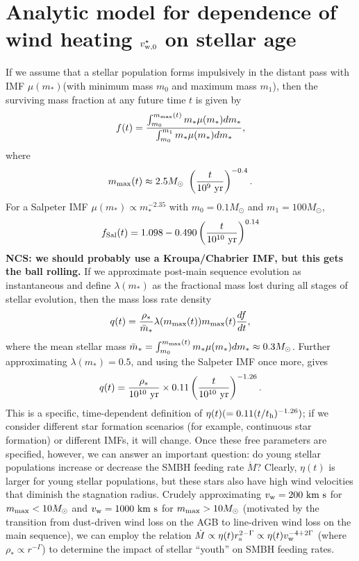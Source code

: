\documentclass[usenatbib,fleqn]{mn2e}
\begin{document}
\section{Analytic model for dependence of wind heating $v_{\rm w,0}^{\star}$ on stellar age}
\label{app:windheat}
If we assume that a stellar population forms impulsively in the distant pass with IMF $\mu(m_*)$(with minimum mass $m_0$ and maximum mass $m_1$), then the surviving mass fraction at any future time $t$ is given by 
\begin{equation}
f(t) =\frac{ \int_{m_0}^{m_{\rm max}(t)} m_* \mu(m_*) dm_* }{ \int_{m_0}^{m_1} m_* \mu(m_*) dm_* },
\end{equation}
where 
\begin{equation}
m_{\rm max}(t) \approx 2.5M_\odot~ \left( \frac{t}{10^9~{\rm yr}} \right)^{-0.4}.
\end{equation}
For a Salpeter IMF $\mu(m_*) \propto m_*^{-2.35}$ with $m_0=0.1M_\odot$ and $m_1=100M_\odot$,
\begin{equation}
f_{\rm Sal}(t) = 1.098 - 0.490 \left(\frac{t}{10^{10}~{\rm yr}} \right)^{0.14}
\end{equation}
{\bf NCS: we should probably use a Kroupa/Chabrier IMF, but this gets the ball rolling.}
If we approximate post-main sequence evolution as instantaneous and define $\lambda(m_*)$ as the fractional mass lost during all stages of stellar evolution, then the mass loss rate density
\begin{equation}
q(t) = \frac{\rho_*}{\bar{m}_*} \lambda(m_{\rm max}(t)) m_{\rm max}(t) \frac{df}{dt},
\end{equation}
where the mean stellar mass $\bar{m}_* = \int_{m_0}^{m_{\rm max}(t)} m_*\mu(m_*)dm_* \approx 0.3 M_\odot$.  Further approximating $\lambda(m_*)=0.5$, and using the Salpeter IMF once more, gives
\begin{equation}
q(t) = \frac{\rho_*}{10^{10}~{\rm yr}} \times 0.11 \left(\frac{t}{10^{10}~{\rm yr}} \right)^{-1.26}.
\end{equation}
This is a specific, time-dependent definition of $\eta(t) (=0.11(t/t_{\rm h})^{-1.26})$; if we consider different star formation scenarios (for example, continuous star formation) or different IMFs, it will change.  Once these free parameters are specified, however, we can answer an important question: do young stellar populations increase or decrease the SMBH feeding rate $\dot{M}$?  Clearly, $\eta(t)$ is larger for young stellar populations, but these stars also have high wind velocities that diminish the stagnation radius.  Crudely approximating $v_{\rm w}=200~{\rm km~s}$ for $m_{\rm max} < 10M_{\odot}$ and $v_{\rm w}=1000~{\rm km~s}$ for $m_{\rm max} > 10M_{\odot}$ (motivated by the transition from dust-driven wind loss on the AGB to line-driven wind loss on the main sequence), we can employ the relation $\dot{M} \propto \eta(t) r_{\rm s}^{2-\Gamma}\propto \eta(t) v_{\rm w}^{-4+2\Gamma}$ (where $\rho_* \propto r^{-\Gamma}$) to determine the impact of stellar ``youth'' on SMBH feeding rates.
\end{document}
